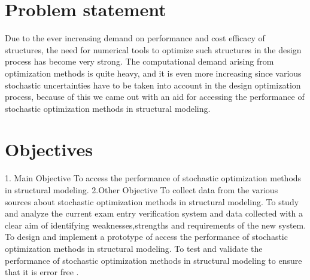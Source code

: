 \documentclass[]{report}
\title{}
\author{}
\begin{document}
\maketitle

\section{Problem statement}
Due to the ever increasing demand on performance and cost efficacy of structures, the need for numerical tools to optimize such structures in the design
process has become very strong. The computational demand arising from optimization methods is quite heavy, and it is even more increasing since various stochastic uncertainties have to be taken into account in the design optimization
process, because of this we came out with an aid for accessing the performance of stochastic optimization methods in structural modeling.
\section{Objectives}
1. Main Objective 
To access the performance of stochastic optimization methods
in structural modeling. 
2.Other Objective 
To collect data from the various sources about stochastic optimization methods in structural modeling.
 To study and analyze the current exam entry verification system and data collected with a clear aim of identifying weaknesses,strengths and requirements of the new system.
 To design and implement a prototype of access the performance of stochastic optimization methods in structural modeling.
 To test and validate the performance of stochastic optimization
methods in structural modeling to ensure that it is error free .
\end{document}
